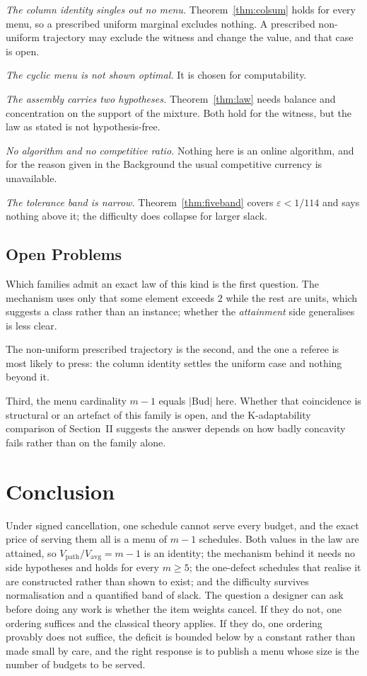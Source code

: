 \documentclass[conference]{IEEEtran}
\theoremstyle{definition}
\begin{document}
\emph{The column identity singles out no menu.} Theorem~\ref{thm:colsum} holds for every
menu, so a prescribed uniform marginal excludes nothing. A prescribed non-uniform trajectory
may exclude the witness and change the value, and that case is open.

\emph{The cyclic menu is not shown optimal.} It is chosen for computability.

\emph{The assembly carries two hypotheses.} Theorem~\ref{thm:law} needs balance and
concentration on the support of the mixture. Both hold for the witness, but the law as stated
is not hypothesis-free.

\emph{No algorithm and no competitive ratio.} Nothing here is an online algorithm, and for
the reason given in the Background the usual competitive currency is unavailable.

\emph{The tolerance band is narrow.} Theorem~\ref{thm:fiveband} covers
$\varepsilon<1/114$ and says nothing above it; the difficulty does collapse for larger
slack.

\subsection{Open Problems}

Which families admit an exact law of this kind is the first question. The mechanism uses only
that some element exceeds $2$ while the rest are units, which suggests a class rather than an
instance; whether the \emph{attainment} side generalises is less clear.

The non-uniform prescribed trajectory is the second, and the one a referee is most likely to
press: the column identity settles the uniform case and nothing beyond it.

Third, the menu cardinality $m-1$ equals $|\mathrm{Bud}|$ here. Whether that coincidence is
structural or an artefact of this family is open, and the K-adaptability comparison of
Section~II suggests the answer depends on how badly concavity fails rather than on the family
alone.

\section{Conclusion}

Under signed cancellation, one schedule cannot serve every budget, and the exact price of
serving them all is a menu of $m-1$ schedules. Both values in the law are attained, so
$V_{\mathrm{path}}/V_{\mathrm{avg}}=m-1$ is an identity; the mechanism behind it needs no
side hypotheses and holds for every $m\ge5$; the one-defect schedules that realise it are
constructed rather than shown to exist; and the difficulty survives normalisation and a
quantified band of slack. The question a designer can ask before doing any work is whether
the item weights cancel. If they do not, one ordering suffices and the classical theory
applies. If they do, one ordering provably does not suffice, the deficit is bounded below by
a constant rather than made small by care, and the right response is to publish a menu whose
size is the number of budgets to be served.
\end{document}
